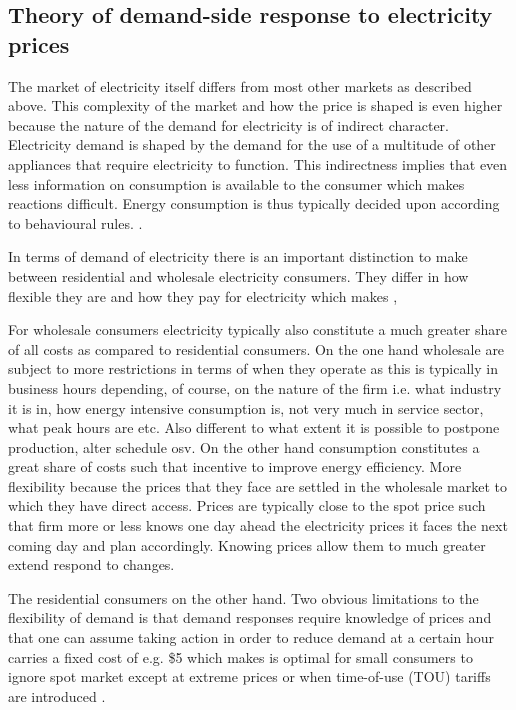 \subsection{Theory of demand-side response to electricity prices}
\label{subsec:t_demand}
The market of electricity itself differs from most other markets as described above. This complexity of the market and how the price is shaped is even higher because the nature of the demand for electricity is of indirect character. Electricity demand is shaped by the demand for the use of a multitude of other appliances that require electricity to function. This indirectness implies that even less information on consumption is available to the consumer which makes reactions difficult. Energy consumption is thus typically decided upon according to behavioural rules. \citep{kirschen2003demand}. 

In terms of demand of electricity there is an important distinction to make between residential and wholesale electricity consumers. They differ in how flexible they are and how they pay for electricity which makes , 

For wholesale consumers electricity typically also constitute a much greater share of all costs as compared to residential consumers. 
On the one hand wholesale are subject to more restrictions in terms of when they operate as this is typically in business hours depending, of course, on the nature of the firm i.e. what industry it is in, how energy intensive consumption is, not very much in service sector, what peak hours are etc. Also different to what extent it is possible to postpone production, alter schedule osv. On the other hand consumption constitutes a great share of costs such that incentive to improve energy efficiency. More flexibility because the prices that they face are settled in the wholesale market to which they have direct access. Prices are typically close to the spot price such that firm more or less knows one day ahead the electricity prices it faces the next coming day and plan accordingly. Knowing prices allow them to much greater extend respond to changes. 

The residential consumers on the other hand. 
Two obvious limitations to the flexibility of demand is that demand responses require knowledge of prices and that one can assume taking action in order to reduce demand at a certain hour carries a fixed cost of e.g. \$5 which makes is optimal for small consumers to ignore spot market except at extreme prices or when time-of-use (TOU) tariffs are introduced \citep{wolak2011residential}. 

